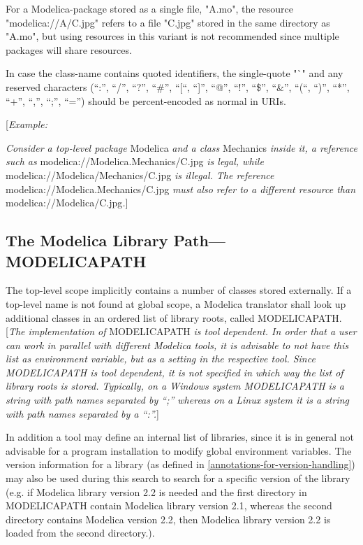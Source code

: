 \documentclass[10pt,a4paper]{report}
\def\doublelabel#1{\label{#1}\hypertarget{#1}{}}
\begin{document}
For a Modelica-package stored as a single file, "A.mo", the resource
"modelica://A/C.jpg" refers to a file "C.jpg" stored in the same
directory as "A.mo", but using resources in this variant is not
recommended since multiple packages will share resources.

In case the class-name contains quoted identifiers, the single-quote "`"
and any reserved characters (``:'', ``/'', ``?'', ``\#'', ``{[}``,
``{]}'', ``@'', ``!'', ``\$'', ``\&'', ``(``, ``)'', ``*'', ``+'',
``,'', ``;'', ``='') should be percent-encoded as normal in URIs.

{[}\emph{Example:}

\emph{Consider a top-level package} Modelica \emph{and a class}
Mechanics \emph{inside it, a reference such as}
modelica://Modelica.Mechanics/C.jpg \emph{is legal, while}
modelica://Modelica/Mechanics/C.jpg \emph{is illegal. The reference}
modelica://Modelica.Mechanics/C.jpg \emph{must also refer to a different
resource than} modelica://Modelica/C.jpg\emph{.}{]}

\subsection{The Modelica Library Path---MODELICAPATH}\doublelabel{the-modelica-library-path-modelicapath}

The top-level scope implicitly contains a number of classes stored
externally. If a top-level name is not found at global scope, a Modelica
translator shall look up additional classes in an ordered list of
library roots, called MODELICAPATH. {[}\emph{The implementation of}
MODELICAPATH \emph{is tool dependent. In order that a user can work in
parallel with different Modelica tools, it is advisable to not have this
list as environment variable, but as a setting in the respective tool.
Since MODELICAPATH is tool dependent, it is not specified in which way
the list of library roots is stored. Typically, on a Windows system
MODELICAPATH is a string with path names separated by ``;'' whereas on a
Linux system it is a string with path names separated by a ``:''.}{]}

In addition a tool may define an internal list of libraries, since it is
in general not advisable for a program installation to modify global
environment variables. The version information for a library (as defined
in \ref{annotations-for-version-handling}) may also be used during this search to search for a
specific version of the library (e.g. if Modelica library version 2.2 is
needed and the first directory in MODELICAPATH contain Modelica library
version 2.1, whereas the second directory contains Modelica version 2.2,
then Modelica library version 2.2 is loaded from the second directory.).
\end{document}

